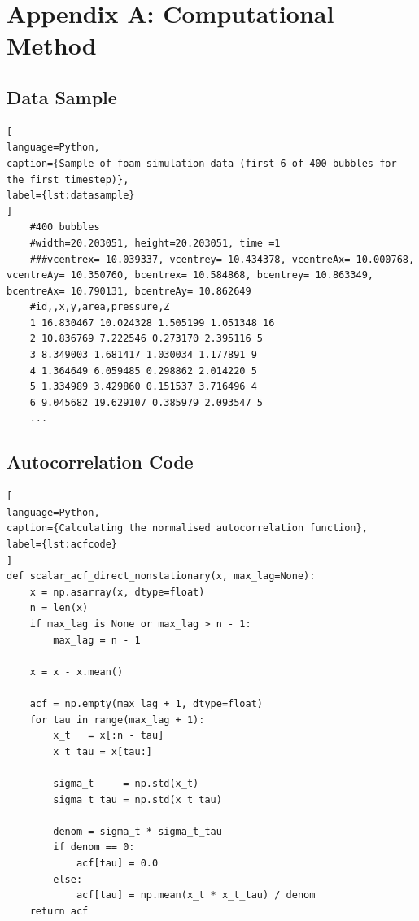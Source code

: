 \documentclass[paper=a4, fontsize=12pt]{scrartcl} %
\title{\thesistitle}
\author{\authorname}
\author{\Large \normalfont Conor Kirby \\[5pt]} %
\date{\normalsize\today} %
\numberwithin{equation}{section} %
\numberwithin{figure}{section} %
\numberwithin{table}{section} %
\begin{document}

\newpage

\newpage

\newpage
\tableofcontents
\clearpage




\newpage


\printbibliography

\section{Appendix A: Computational Method}
\subsection*{Data Sample}
\begin{lstlisting}[
language=Python,
caption={Sample of foam simulation data (first 6 of 400 bubbles for the first timestep)},
label={lst:datasample}
]
    #400 bubbles
    #width=20.203051, height=20.203051, time =1
    ###vcentrex= 10.039337, vcentrey= 10.434378, vcentreAx= 10.000768, vcentreAy= 10.350760, bcentrex= 10.584868, bcentrey= 10.863349, bcentreAx= 10.790131, bcentreAy= 10.862649
    #id,,x,y,area,pressure,Z
    1 16.830467 10.024328 1.505199 1.051348 16
    2 10.836769 7.222546 0.273170 2.395116 5
    3 8.349003 1.681417 1.030034 1.177891 9
    4 1.364649 6.059485 0.298862 2.014220 5
    5 1.334989 3.429860 0.151537 3.716496 4
    6 9.045682 19.629107 0.385979 2.093547 5
    ...
\end{lstlisting}

\subsection*{Autocorrelation Code}
\begin{lstlisting}[
language=Python,
caption={Calculating the normalised autocorrelation function},
label={lst:acfcode}
]
def scalar_acf_direct_nonstationary(x, max_lag=None):
    x = np.asarray(x, dtype=float)
    n = len(x)
    if max_lag is None or max_lag > n - 1:
        max_lag = n - 1

    x = x - x.mean()

    acf = np.empty(max_lag + 1, dtype=float)
    for tau in range(max_lag + 1):
        x_t   = x[:n - tau]
        x_t_tau = x[tau:]

        sigma_t     = np.std(x_t)
        sigma_t_tau = np.std(x_t_tau)

        denom = sigma_t * sigma_t_tau
        if denom == 0:
            acf[tau] = 0.0
        else:
            acf[tau] = np.mean(x_t * x_t_tau) / denom
    return acf
\end{lstlisting}
\end{document}
